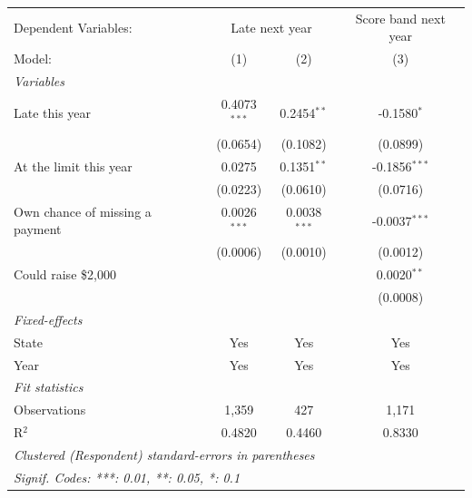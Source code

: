 
\begingroup
\centering
\begin{tabular}{lccc}
   \tabularnewline \midrule \midrule
   Dependent Variables: & \multicolumn{2}{c}{Late next year} & Score band next year\\
   Model:                          & (1)            & (2)            & (3)\\  
   \midrule
   \emph{Variables}\\
   Late this year                  & 0.4073$^{***}$ & 0.2454$^{**}$  & -0.1580$^{*}$\\   
                                   & (0.0654)       & (0.1082)       & (0.0899)\\   
   At the limit this year          & 0.0275         & 0.1351$^{**}$  & -0.1856$^{***}$\\   
                                   & (0.0223)       & (0.0610)       & (0.0716)\\   
   Own chance of missing a payment & 0.0026$^{***}$ & 0.0038$^{***}$ & -0.0037$^{***}$\\   
                                   & (0.0006)       & (0.0010)       & (0.0012)\\   
   Could raise \$2,000             &                &                & 0.0020$^{**}$\\   
                                   &                &                & (0.0008)\\   
   \midrule
   \emph{Fixed-effects}\\
   State                           & Yes            & Yes            & Yes\\  
   Year                            & Yes            & Yes            & Yes\\  
   \midrule
   \emph{Fit statistics}\\
   Observations                    & 1,359          & 427            & 1,171\\  
   R$^2$                           & 0.4820         & 0.4460         & 0.8330\\  
   \midrule \midrule
   \multicolumn{4}{l}{\emph{Clustered (Respondent) standard-errors in parentheses}}\\
   \multicolumn{4}{l}{\emph{Signif. Codes: ***: 0.01, **: 0.05, *: 0.1}}\\
\end{tabular}
\par\endgroup


